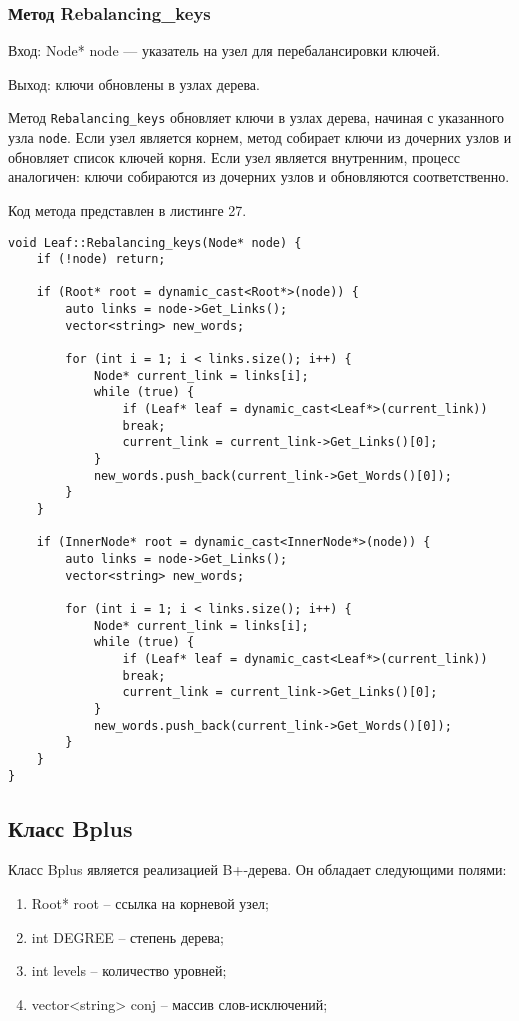 \documentclass[10pt,a4paper,final]{article} %
\begin{document}
\subsubsection{Метод Rebalancing\_keys} Вход: Node* node — указатель на узел для перебалансировки ключей. \par

Выход: ключи обновлены в узлах дерева. \par

\par Метод \texttt{Rebalancing\_keys} обновляет ключи в узлах дерева, начиная с указанного узла \texttt{node}. Если узел является корнем, метод собирает ключи из дочерних узлов и обновляет список ключей корня. Если узел является внутренним, процесс аналогичен: ключи собираются из дочерних узлов и обновляются соответственно.

Код метода представлен в листинге 27. \begin{lstlisting}[label=rebalancingKeysMethod, caption = Метод Rebalancing\_keys для класса Leaf] 
void Leaf::Rebalancing_keys(Node* node) {
	if (!node) return;
	
	if (Root* root = dynamic_cast<Root*>(node)) {
		auto links = node->Get_Links();
		vector<string> new_words;
		
		for (int i = 1; i < links.size(); i++) {
			Node* current_link = links[i];
			while (true) {
				if (Leaf* leaf = dynamic_cast<Leaf*>(current_link))
				break;
				current_link = current_link->Get_Links()[0];
			}
			new_words.push_back(current_link->Get_Words()[0]);
		}
	}
	
	if (InnerNode* root = dynamic_cast<InnerNode*>(node)) {
		auto links = node->Get_Links();
		vector<string> new_words;
		
		for (int i = 1; i < links.size(); i++) {
			Node* current_link = links[i];
			while (true) {
				if (Leaf* leaf = dynamic_cast<Leaf*>(current_link))
				break;
				current_link = current_link->Get_Links()[0];
			}
			new_words.push_back(current_link->Get_Words()[0]);
		}
	}
}\end{lstlisting}


\subsection{Класс Bplus}
Класс Bplus является реализацией B+-дерева. Он обладает следующими полями:
\begin{enumerate}
	\item Root* root -- ссылка на корневой узел;
	\item int DEGREE -- степень дерева;
	\item int levels -- количество уровней;
	\item vector<string> conj -- массив слов-исключений;
\end{enumerate}
\end{document}
